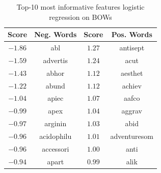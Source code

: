 \documentclass[11pt]{article}
\begin{document}
\vspace{0.5cm}
\hspace{-2cm}
\begin{minipage}[b]{0.48\textwidth}
        \begin{table}[H]
            \begin{center}
                \begin{tabular}{||c||c|c|c||}
                    \hline
                    Score & Neg. Words & Score & Pos. Words\\
                    \hline
                    \hline
                    $-1.86$ & abl & $1.27$ & antisept \\      \hline
                	$-1.59$ & advertis & $1.24$ &	acut\\          \hline 
                	$-1.43$ & abhor & $1.12$ & aesthet\\        \hline
                	$-1.22$ & abund & $1.12$ & achiev\\         \hline
                	$-1.04$ & apiec & $1.07$ & aafco\\          \hline
                	$-0.99$ & apex & $1.04$ & aggrav\\         \hline
                	$-0.97$ & arginin & $1.03$ & abid\\           \hline
                	$-0.96$ & acidophilu & $1.01$ & adventuresom\\   \hline
                	$-0.96$ & accessori & $1.00$ & anti  \\         \hline
                	$-0.94$ & apart & $0.99$ & alik\\        \hline
                    \hline
                    \hline
                \end{tabular}
            \caption{Top-10 most informative features logistic regression on BOWs}
            \label{logreg_t1}
            \end{center}
        \end{table}
\end{minipage}
\hspace{2cm}
\vspace{25pt}
\end{document}
